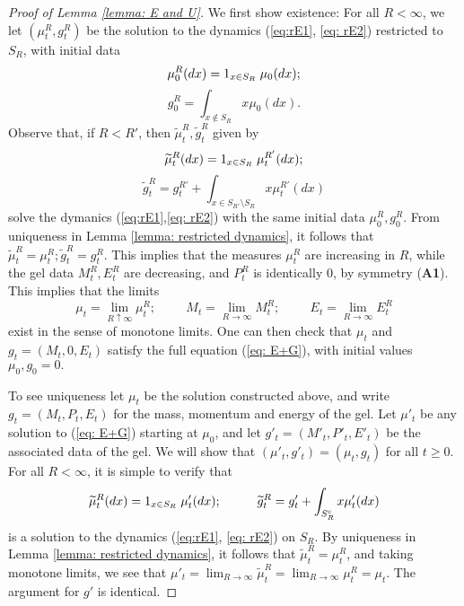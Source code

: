 \begin{proof}[Proof of Lemma \ref{lemma: E and U}] 
We first show existence: For all $R<\infty$, we let $(\mu^R_t, g^R_t)$ be the solution to the dynamics (\ref{eq:rE1}, \ref{eq: rE2}) restricted to $S_R$, with initial data \begin{equation} \mu^R_0(dx)=1_{x\in S_R}\hspace{0.1cm}\mu_0(dx); \end{equation} \begin{equation} g^R_0 = \int_{x\not\in S_R} x\mu_0(dx). \end{equation}  Observe that, if $R<R'$, then $\widetilde{\mu}^R_t, \widetilde{g}^R_t$ given by \begin{equation} \widetilde{\mu}^R_t(dx)=1_{x\in S_R}\hspace{0.1cm}\mu^{R'}_t(dx);\end{equation} \begin{equation} \widetilde{g}^R_t=g^{R'}_t+\int_{x\in S_{R'}\setminus S_R} x \mu^{R'}_t(dx)\end{equation} solve the dymanics (\ref{eq:rE1},\ref{eq: rE2}) with the same initial data $\mu^R_0, g^R_0$. From uniqueness in Lemma \ref{lemma: restricted dynamics}, it follows that $\widetilde{\mu}^R_t=\mu^R_t; \widetilde{g}^R_t=g^R_t$. This implies that the measures $\mu^R_t$ are increasing in $R$, while the gel data $M^R_t, E^R_t$ are decreasing, and $P^R_t$ is identically $0$, by symmetry (\textbf{A1}). This implies that the limits \begin{equation} \mu_t=\lim_{R\uparrow \infty} \mu^R_t; \hspace{1cm} M_t=\lim_{R\rightarrow \infty} M^R_t; \hspace{1cm} E_t=\lim_{R\rightarrow \infty} E^R_t \end{equation} exist in the sense of monotone limits. One can then check that $\mu_t$ and $g_t=(M_t,0,E_t)$ satisfy the full equation (\ref{eq: E+G}), with initial values $\mu_0, g_0=0.$

To see uniqueness let $\mu_t$ be the solution constructed above, and write $g_t=(M_t,P_t,E_t)$ for the mass, momentum and energy of the gel. Let $\mu'_t$ be any solution to (\ref{eq: E+G}) starting at $\mu_0$, and let $g'_t=(M'_t, P'_t,E'_t)$ be the associated data of the gel. We will show that $(\mu'_t,g'_t)=(\mu_t, g_t)$ for all $t\ge 0.$ \medskip \\ For all $R<\infty$, it is simple to verify that \begin{equation} \widetilde{\mu}^R_t(dx)=1_{x\in S_R}\hspace{0.1cm} \mu'_t(dx);\hspace{1cm} \widetilde{g}^R_t=g'_t+\int_{S^\mathrm{c}_R} x \mu'_t(dx) \end{equation} is a solution to the dynamics (\ref{eq:rE1}, \ref{eq: rE2}) on $S_R$. By uniqueness in Lemma \ref{lemma: restricted dynamics}, it follows that $\widetilde{\mu}^R_t=\mu^R_t$, and taking monotone limits, we see that $\mu'_t=\lim_{R\rightarrow \infty} \widetilde{\mu}^R_t=\lim_{R\rightarrow \infty} {\mu}^R_t=\mu_t$. The argument for $g'$ is identical.
\end{proof}


